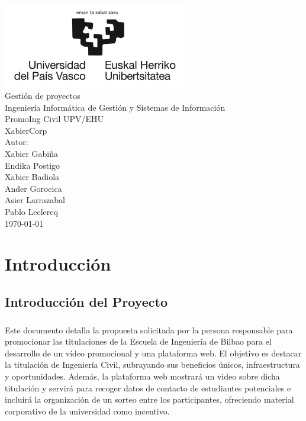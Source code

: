 \documentclass{report}
\begin{document}
    \begin{titlepage}
        \centering
        \includegraphics[width=0.6\textwidth]{./img/logo.jpg}\\
        \vspace{1cm}
        \LARGE Gestión de proyectos\\
        \vspace{0.5cm}
        \Large Ingeniería Informática de Gestión y Sistemas de Información\\
        \vspace{3cm}
        \Huge PromoIng Civil UPV/EHU\\
        \huge XabierCorp\\
        \vspace{2.5cm}
        \Large Autor:\\
        \vspace{0.2cm}
        \large Xabier Gabiña\\
        \large Endika Postigo\\
        \large Xabier Badiola\\
        \large Ander Gorocica\\
        \large Asier Larrazabal\\
        \large Pablo Leclercq\\
        \vfill
        \today
    \end{titlepage}
    \tableofcontents
    \listoffigures
    \listoftables
    \chapter{Introducción}
        \section{Introducción del Proyecto}
            \paragraph*{}
            Este documento detalla la propuesta solicitada por la persona responsable para promocionar las titulaciones de la Escuela de Ingeniería de Bilbao para el desarrollo de un vídeo promocional y una plataforma web. El objetivo es destacar la titulación de Ingeniería Civil, subrayando sus beneficios únicos, infraestructura y oportunidades. Además, la plataforma web mostrará un video sobre dicha titulación y servirá para recoger datos de contacto de estudiantes potenciales e incluirá la organización de un sorteo entre los participantes, ofreciendo material corporativo de la universidad como incentivo.
\end{document}
